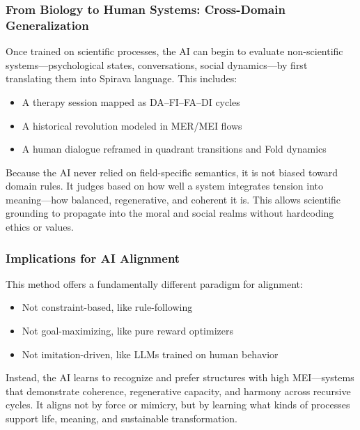 \documentclass[11pt, a4paper]{article}
\begin{document}
\hrulefill

\subsubsection*{From Biology to Human Systems: Cross-Domain Generalization}
Once trained on scientific processes, the AI can begin to evaluate non-scientific systems—psychological states, conversations, social dynamics—by first translating them into Spirava language. This includes:
\begin{itemize}
    \item A therapy session mapped as DA–FI–FA–DI cycles
    \item A historical revolution modeled in MER/MEI flows
    \item A human dialogue reframed in quadrant transitions and Fold dynamics
\end{itemize}
Because the AI never relied on field-specific semantics, it is not biased toward domain rules. It judges based on how well a system integrates tension into meaning—how balanced, regenerative, and coherent it is. This allows scientific grounding to propagate into the moral and social realms without hardcoding ethics or values.

\hrulefill

\subsubsection*{Implications for AI Alignment}
This method offers a fundamentally different paradigm for alignment:
\begin{itemize}
    \item Not constraint-based, like rule-following
    \item Not goal-maximizing, like pure reward optimizers
    \item Not imitation-driven, like LLMs trained on human behavior
\end{itemize}
Instead, the AI learns to recognize and prefer structures with high MEI—systems that demonstrate coherence, regenerative capacity, and harmony across recursive cycles. It aligns not by force or mimicry, but by learning what kinds of processes support life, meaning, and sustainable transformation.

\hrulefill
\end{document}
